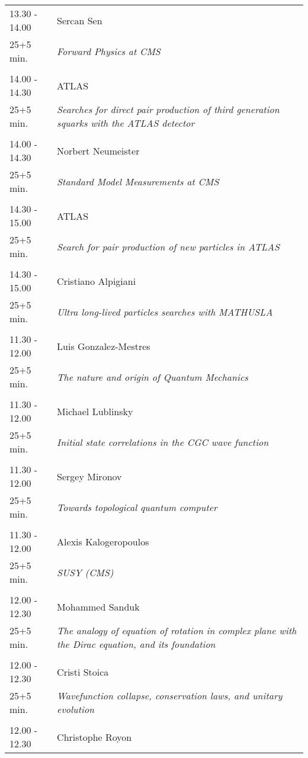 \begin{longtable}{p{3cm}p{13cm}}
13.30 - 14.00 & Sercan Sen\\ 
25+5 min. & {\it Forward Physics at CMS}\\ 
 & \\ 
14.00 - 14.30 & ATLAS\\ 
25+5 min. & {\it Searches for direct pair production of third generation squarks with the ATLAS detector}\\ 
 & \\ 
14.00 - 14.30 & Norbert Neumeister\\ 
25+5 min. & {\it Standard Model Measurements at CMS}\\ 
 & \\ 
14.30 - 15.00 & ATLAS\\ 
25+5 min. & {\it Search for pair production of new particles in ATLAS}\\ 
 & \\ 
14.30 - 15.00 & Cristiano Alpigiani\\ 
25+5 min. & {\it Ultra long-lived particles searches with MATHUSLA}\\ 
 & \\ 
11.30 - 12.00 & Luis Gonzalez-Mestres\\ 
25+5 min. & {\it The nature and origin of Quantum Mechanics}\\ 
 & \\ 
11.30 - 12.00 & Michael Lublinsky\\ 
25+5 min. & {\it Initial state correlations in the CGC wave function}\\ 
 & \\ 
11.30 - 12.00 & Sergey Mironov\\ 
25+5 min. & {\it Towards topological quantum computer}\\ 
 & \\ 
11.30 - 12.00 & Alexis Kalogeropoulos\\ 
25+5 min. & {\it SUSY (CMS)}\\ 
 & \\ 
12.00 - 12.30 & Mohammed Sanduk\\ 
25+5 min. & {\it The analogy of equation of rotation in complex plane with the Dirac equation, and its foundation}\\ 
 & \\ 
12.00 - 12.30 & Cristi Stoica\\ 
25+5 min. & {\it Wavefunction collapse, conservation laws, and unitary evolution}\\ 
 & \\ 
12.00 - 12.30 & Christophe Royon\\ 

\end{longtable}
